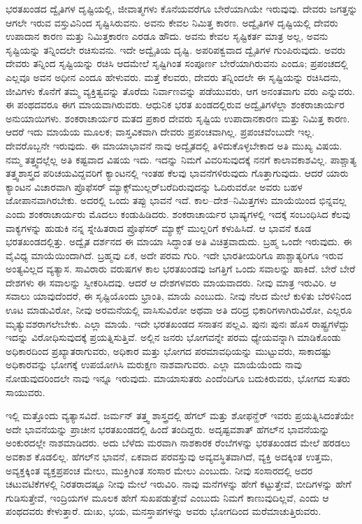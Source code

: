 ಭರತಖಂಡದ ದ್ವೈತಿಗಳ ದೃಷ್ಟಿಯಲ್ಲಿ, ಜೀವಾತ್ಮಗಳು ಕೊನೆಯವರೆಗೂ ಬೇರೆಯಾಗಿಯೇ ಇರುವುವು. ದೇವರು ಜಗತ್ತನ್ನು ಆಗಲೇ ಇರುವ ವಸ್ತುವಿನಿಂದ ಸೃಷ್ಟಿಸಿರುವನು. ಅವನು ಕೇವಲ ನಿಮಿತ್ತ ಕಾರಣ. ಅದ್ವೈತಿಗಳ ದೃಷ್ಟಿಯಲ್ಲಿ ದೇವರು ಉಪಾದಾನ ಕಾರಣ ಮತ್ತು ನಿಮಿತ್ತಕಾರಣ ಎರಡೂ ಹೌದು. ಅವನು ಕೇವಲ ಸೃಷ್ಟಿಕರ್ತ ಮಾತ್ರ ಅಲ್ಲ, ಅವನು ಸೃಷ್ಟಿಯನ್ನು ತನ್ನಿಂದಲೇ ರಚಿಸುವನು. ಇದೇ ಅದ್ವೈತಿಯ ದೃಷ್ಟಿ. ಅಪರಿಪಕ್ವವಾದ ದ್ವೈತಿಗಳ ಗುಂಪಿರುವುದು. ಅವರು ದೇವರು ತನ್ನಿಂದ ಸೃಷ್ಟಿಯನ್ನು ರಚಿಸಿ ಆದಮೇಲೆ ಸೃಷ್ಟಿಗಿಂತ ಸಂಪೂರ್ಣ ಬೇರೆಯಾಗಿರುವನು ಎಂದೂ; ಪ್ರಪಂಚದಲ್ಲಿ ಎಲ್ಲವೂ ಅವನ ಅಧೀನ ಎಂದೂ ಹೇಳುವರು. ಮತ್ತೆ ಕೆಲವರು, ದೇವರು ತನ್ನಿಂದಲೇ ಈ ಸೃಷ್ಟಿಯನ್ನು ರಚಿಸಿದನು, ಜೀವಿಗಳು ಕೊನೆಗೆ ತಮ್ಮ ವ್ಯಕ್ತಿತ್ವವನ್ನು ತೊರೆದು ನಿರ್ವಾಣವನ್ನು ಪಡೆಯುವರು, ಆಗ ಅನಂತವಾಗು ವರು ಎನ್ನುವರು. ಈ ಪಂಥದವರೂ ಈಗ ಮಾಯವಾಗಿರುವರು. ಆಧುನಿಕ ಭರತ ಖಂಡದಲ್ಲಿರುವ ಅದ್ವೈತಿಗಳೆಲ್ಲಾ ಶಂಕರಾಚಾರ್ಯರ ಅನುಯಾಯಿಗಳು. ಶಂಕರಾಚಾರ್ಯರ ಮತದ ಪ್ರಕಾರ ದೇವರು ಸೃಷ್ಟಿಯ ಉಪಾದಾನಕಾರಣ ಮತ್ತು ನಿಮಿತ್ತ ಕಾರಣ. ಆದರೆ ಇದು ಮಾಯೆಯ ಮೂಲಕ; ವಾಸ್ತವಿಕವಾಗಿ ದೇವರು ಪ್ರಪಂಚವಾಗಿಲ್ಲ. ಪ್ರಪಂಚವೆಂಬುದೇ ಇಲ್ಲ. ದೇವರೊಬ್ಬನೇ ಇರುವುದು. ಈ ಮಾಯಾಭಾವನೆ ನಾವು ಅದ್ವೈತದಲ್ಲಿ ತಿಳಿದುಕೊಳ್ಳಬೇಕಾದ ಅತಿ ಮುಖ್ಯ ವಿಷಯ. ನಮ್ಮ ತತ್ತ್ವದಲ್ಲೆಲ್ಲ ಅತಿ ಕಷ್ಟವಾದ ವಿಷಯ ಇದು. ಇದನ್ನು ನಿಮಗೆ ವಿವರಿಸುವುದಕ್ಕೆ ನನಗೆ ಕಾಲಾವಕಾಶವಿಲ್ಲ. ಪಾಶ್ಚಾತ್ಯ ತತ್ತ್ವಶಾಸ್ತ್ರದ ಪರಿಚಯವಿದ್ದವರಿಗೆ ಕ್ಯಾಂಟನಲ್ಲಿ ಇಂತಹ ಕೆಲವು ಭಾವನೆಗಳಿರುವುದು ಗೊತ್ತಾಗುವುದು. ಆದರೆ ಯಾರು ಕ್ಯಾಂಟನ ವಿಚಾರವಾಗಿ ಪ್ರೊಫೆಸರ್​ ಮ್ಯಾಕ್ಸ್‌ಮುಲ್ಲರ್​ ಬರೆದಿರುವುದನ್ನು ಓದಿರುವರೋ ಅವರು ಬಹಳ ಜೋಪಾನವಾಗಿರಬೇಕು. ಅದರಲ್ಲಿ ಒಂದು ತಪ್ಪು ಭಾವನೆ ಇದೆ. ಕಾಲ–ದೇಶ–ನಿಮಿತ್ತಗಳು ಮಾಯೆಯಿಂದ ಭಿನ್ನವಲ್ಲ ಎಂದು ಶಂಕರಾಚಾರ್ಯರು ಮೊದಲು ಕಂಡುಹಿಡಿದರು. ಶಂಕರಾಚಾರ್ಯರ ಭಾಷ್ಯಗಳಲ್ಲಿ ಇದಕ್ಕೆ ಸಂಬಂಧಿಸಿದ ಕೆಲವು ವಾಕ್ಯಗಳನ್ನು ಹುಡುಕಿ ನನ್ನ ಸ್ನೇಹಿತರಾದ ಪ್ರೊಫೆಸರ್​ ಮ್ಯಾಕ್ಸ್ ಮುಲ್ಲರಿಗೆ ಕಳುಹಿಸಿದೆ. ಆ ಭಾವನೆ ಕೂಡ ಭರತಖಂಡದಲ್ಲಿತ್ತು. ಅದ್ವೈತ ದರ್ಶನದ ಈ ಮಾಯಾ ಸಿದ್ಧಾಂತ ಅತಿ ವಿಚಿತ್ರವಾದುದು. ಬ್ರಹ್ಮ ಒಂದೇ ಇರುವುದು. ಈ ವೈವಿಧ್ಯ ಮಾಯೆಯಿಂದಾಗಿದೆ. ಬ್ರಹ್ಮವು ಏಕ, ಅದೇ ಪರಮ ಗುರಿ. ಇದೇ ಭಾರತೀಯರಿಗೂ ಪಾಶ್ಚಾತ್ಯರಿಗೂ ಇರುವ ಅಂತ್ಯವಿಲ್ಲದ ವ್ಯತ್ಯಾಸ. ಸಾವಿರಾರು ವರುಷಗಳ ಕಾಲ ಭರತಖಂಡವು ಜಗತ್ತಿಗೆ ಒಂದು ಸವಾಲನ್ನು ಹಾಕಿದೆ. ಬೇರೆ ಬೇರೆ ದೇಶಗಳು ಈ ಸವಾಲನ್ನು ಸ್ವೀಕರಿಸಿದವು. ಆದರೆ ಆ ದೇಶಗಳವರು ಮಾಯವಾದರು. ನೀವು ಮಾತ್ರ ಇರುವಿರಿ. ಆ ಸವಾಲು ಯಾವುದೆಂದರೆ, ಈ ಸೃಷ್ಟಿಯೊಂದು ಭ್ರಾಂತಿ, ಮಾಯೆ ಎಂಬುದು. ನೀವು ನೆಲದ ಮೇಲೆ ಕುಳಿತು ಬೆರಳಿನಿಂದ ಊಟ ಮಾಡುವಿರೋ, ನೀವು ಅರಮನೆಯಲ್ಲಿ ವಾಸಿಸುವಿರೋ ಅಥವಾ ಅತಿ ದರಿದ್ರ ಭಿಕಾರಿಗಳಾಗಿರುವಿರೋ, ಎಲ್ಲರೂ ಮೃತ್ಯುವಶರಾಗಲೇಬೇಕು. ಎಲ್ಲಾ ಮಾಯೆ. ಇದೇ ಭರತಖಂಡದ ಸನಾತನ ಪಲ್ಲವಿ. ಪುನಃ ಪುನಃ ಹೊಸ ರಾಷ್ಟ್ರಗಳೆದ್ದು ಇದನ್ನು ವಿರೋಧಿಸುವುದಕ್ಕೆ ಪ್ರಯತ್ನಿಸುತ್ತಿವೆ. ಅಲ್ಲಿನ ಜನರು ಭೋಗವನ್ನೇ ಪರಮ ಧ್ಯೇಯವನ್ನಾಗಿ ಮಾಡಿಕೊಂಡು ಅಧಿಕಾರದಿಂದ ಪ್ರಖ್ಯಾತರಾಗುವರು, ಅಧಿಕಾರ ಮತ್ತು ಭೋಗದ ಪರಮಾವಧಿಯನ್ನು ಮುಟ್ಟುವರು, ಸಾಕಾದಷ್ಟು ಅಧಿಕಾರವನ್ನು ಭೋಗಕ್ಕೆ ಉಪಯೋಗಿಸಿ ಮರುಕ್ಷಣ ನಾಶವಾಗುವರು. ಎಲ್ಲಾ ಮಾಯೆಯೆಂದು ನಾವು ನೋಡುವುದರಿಂದಲೇ ನಾವು ಇನ್ನೂ ಇರುವುದು. ಮಾಯಾಸುತರು ಎಂದೆಂದಿಗೂ ಬದುಕಿರುವರು, ಭೋಗದ ಸುತರು ಸಾಯುವರು.

ಇಲ್ಲಿ ಮತ್ತೊಂದು ವ್ಯತ್ಯಾಸವಿದೆ. ಜರ್ಮನ್​ ತತ್ತ್ವ ಶಾಸ್ತ್ರದಲ್ಲಿ ಹೆಗಲ್​ ಮತ್ತು ಶೋಫನ್ಹೆರ್​ ಇವರು ಪ್ರಯತ್ನಿಸಿದಂತೆಯೇ ಅದೇ ಭಾವನೆಯನ್ನು ಪ್ರಾಚೀನ ಭರತಖಂಡದಲ್ಲಿ ಹಿಂದೆ ತಂದಿದ್ದರು. ಅದೃಷ್ಟವಶಾತ್​ ಹೆಗಲ್​ನ ಭಾವನೆಯನ್ನು ಅಂಕುರದಲ್ಲೇ ನಾಶಮಾಡಿದರು. ಅದು ಬೆಳೆದು ಮರವಾಗಿ ನಾಶಕಾರಕ ರೆಂಬೆಗಳನ್ನು ಭರತಖಂಡದ ಮೇಲೆ ಹರಡಲು ಅವಕಾಶ ಕೊಡಲಿಲ್ಲ. ಹೆಗಲ್​ನ ಭಾವನೆ, ಏಕವಾದ ಪರವಸ್ತುವು ಅವ್ಯವಸ್ಥಿತವಾಗಿದೆ, ವ್ಯಕ್ತಿ ಅದಕ್ಕಿಂತ ಉತ್ತಮ, ಅವ್ಯಕ್ತಕ್ಕಿಂತ ವ್ಯಕ್ತಪ್ರಪಂಚ ಮೇಲು, ಮುಕ್ತಿಗಿಂತ ಸಂಸಾರ ಮೇಲು ಎಂಬುದು. ನೀವು ಸಂಸಾರದಲ್ಲಿ ಅದರ ಚಟುವಟಿಕೆಗಳಲ್ಲಿ ನಿರತರಾದಷ್ಟೂ ನೀವು ಮೇಲೆ ಇರುವಿರಿ. ನಾವು ಮನೆಗಳನ್ನು ಹೇಗೆ ಕಟ್ಟುತ್ತೇವೆ, ಬೀದಿಗಳನ್ನು ಹೇಗೆ ಗುಡಿಸುತ್ತೇವೆ, ಇಂದ್ರಿಯಗಳ ಮೂಲಕ ಹೇಗೆ ಸುಖಪಡುತ್ತೇವೆ ಎಂಬುದು ನಿಮಗೆ ಕಾಣುವುದಿಲ್ಲವೆ, ಎಂದು ಆ ಪಂಥದವರು ಕೇಳುತ್ತಾರೆ. ದುಃಖ, ಭಯ, ಮನಸ್ತಾಪಗಳನ್ನು ಅವರು ಭೋಗದಿಂದ ಮರೆಮಾಚುತ್ತಿರುವರು.

